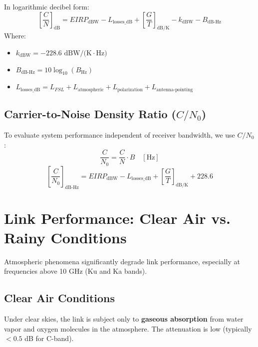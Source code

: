 \documentclass[12pt,a4paper]{article}
\begin{document}
In logarithmic decibel form:
\begin{equation}
  \left[\frac{C}{N}\right]_{\text{dB}} = EIRP_{\text{dBW}} - L_{\text{losses\_dB}} + \left[\frac{G}{T}\right]_{\text{dB/K}} - k_{\text{dBW}} - B_{\text{dB-Hz}}
\end{equation}
Where:
\begin{itemize}[leftmargin=*, itemsep=3pt]
  \item $k_{\text{dBW}} = -228.6 \text{ dBW/(K}\cdot\text{Hz)}$
  \item $B_{\text{dB-Hz}} = 10\log_{10}(B_{\text{Hz}})$
  \item $L_{\text{losses\_dB}} = L_{FSL} + L_{\text{atmospheric}} + L_{\text{polarization}} + L_{\text{antenna-pointing}}$
\end{itemize}

\subsection{Carrier-to-Noise Density Ratio ($C/N_0$)}
To evaluate system performance independent of receiver bandwidth, we use $C/N_0$:
\begin{equation}
  \frac{C}{N_0} = \frac{C}{N} \cdot B \quad [\text{Hz}]
\end{equation}
\begin{equation}
  \left[\frac{C}{N_0}\right]_{\text{dB-Hz}} = EIRP_{\text{dBW}} - L_{\text{losses\_dB}} + \left[\frac{G}{T}\right]_{\text{dB/K}} + 228.6
\end{equation}

\section{Link Performance: Clear Air vs. Rainy Conditions}

Atmospheric phenomena significantly degrade link performance, especially at frequencies above 10 GHz (Ku and Ka bands).

\subsection{Clear Air Conditions}
Under clear skies, the link is subject only to \textbf{gaseous absorption} from water vapor and oxygen molecules in the atmosphere. The attenuation is low (typically $< 0.5$ dB for C-band).
\end{document}
